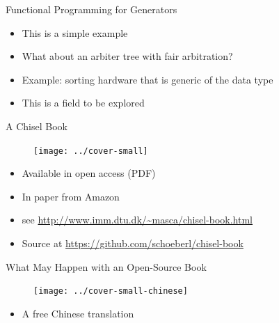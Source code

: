 \begin{frame}[fragile]{Functional Programming for Generators}
\begin{itemize}
\item This is a simple example
\item What about an arbiter tree with fair arbitration?
\item Example: sorting hardware that is generic of the data type
\item This is a field to be explored
\end{itemize}
\end{frame}


%






\begin{frame}[fragile]{A Chisel Book}
\begin{figure}
    \centering
    \texttt{[image: ../cover-small]}
\end{figure}

\begin{itemize}
\item Available in open access (PDF)
\item In paper from Amazon
\item see \url{http://www.imm.dtu.dk/~masca/chisel-book.html}
\item Source at \url{https://github.com/schoeberl/chisel-book}
\end{itemize}
\end{frame}

\begin{frame}[fragile]{What May Happen with an Open-Source Book}
\begin{figure}
    \centering
    \texttt{[image: ../cover-small-chinese]}
\end{figure}

\begin{itemize}
\item A free Chinese translation
\end{itemize}
\end{frame}

